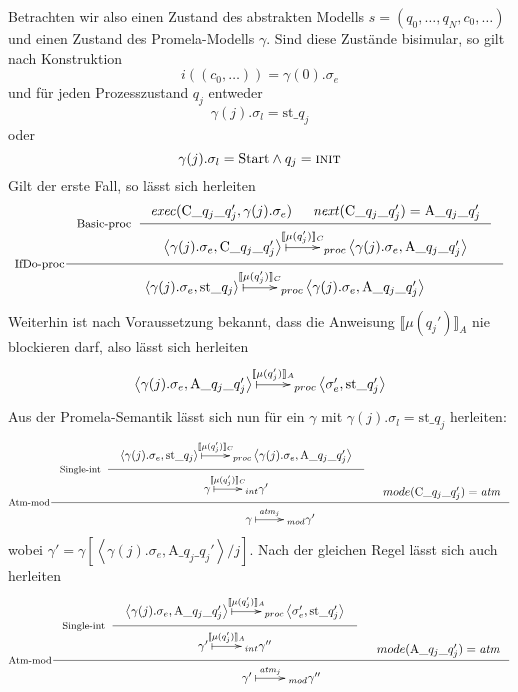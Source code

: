 Betrachten wir also einen Zustand des abstrakten Modells $s=(q_0,\dots,q_N,c_0,\dots)$ und einen Zustand des Promela-Modells $\gamma$.
Sind diese Zustände bisimular, so gilt nach Konstruktion
\[ i((c_0,\dots)) = \gamma(0).\sigma_e \]
und für jeden Prozesszustand $q_j$ entweder
\[ \gamma(j).\sigma_l = \textrm{st\_}q_j \]
oder
\[ \gamma(j).\sigma_l = \textrm{Start} \land q_j = \const{init} \]
Gilt der erste Fall, so lässt sich herleiten
\[ \inference[IfDo-proc]{
  \inference[Basic-proc]{\mathit{exec}(\textrm{C\_}q_j\textrm{\_}q_j',\gamma(j).\sigma_e) & \mathit{next}(\textrm{C\_}q_j\textrm{\_}q_j') = \textrm{A\_}q_j\textrm{\_}q_j'}{
  \xymatrix{ \left<\gamma(j).\sigma_e,\textrm{C\_}q_j\textrm{\_}q_j'\right>\ar@{|->}[r]^-{\llbracket \mu(q_j')\rrbracket_C} & _{proc}
    \left<\gamma(j).\sigma_e,\textrm{A\_}q_j\textrm{\_}q_j'\right>}
  }
  }
  { \xymatrix{ \left<\gamma(j).\sigma_e,\textrm{st\_}q_j\right> \ar@{|->}[r]^-{\llbracket \mu(q_j')\rrbracket_C} & _{proc}
      \left<\gamma(j).\sigma_e,\textrm{A\_}q_j\textrm{\_}q_j'\right>}
  }
\]
Weiterhin ist nach Voraussetzung bekannt, dass die Anweisung $\llbracket \mu(q_j')\rrbracket_A$ nie blockieren darf, also lässt sich herleiten
\[
  \xymatrix{ \left<\gamma(j).\sigma_e,\textrm{A\_}q_j\textrm{\_}q_j'\right> \ar@{|->}[r]^-{\llbracket \mu(q_j')\rrbracket_A} & _{proc}
    \left<\sigma_e',\textrm{st\_}q_j'\right> }
\]
Aus der Promela-Semantik lässt sich nun für ein $\gamma$ mit $\gamma(j).\sigma_l = \textrm{st\_}q_j$ herleiten:
\[
\inference[Atm-mod]{
  \inference[Single-int]{
    \xymatrix{ \left<\gamma(j).\sigma_e,\textrm{st\_}q_j\right> \ar@{|->}[r]^-{\llbracket \mu(q_j')\rrbracket_C} & _{proc}
      \left<\gamma(j).\sigma_e,\textrm{A\_}q_j\textrm{\_}q_j'\right> }
  }{
    \xymatrix{ \gamma \ar@{|->}[r]^-{\llbracket \mu(q_j')\rrbracket_C} & _{int}
      \gamma'
    }
  } & mode(\textrm{C\_}q_j\textrm{\_}q_j') = \mathit{atm}
}{
  \xymatrix{ \gamma \ar@{|->}[r]^-{\mathit{atm}_j} & _{mod}
    \gamma'
  }
}
\]
wobei $\gamma' = \gamma[\left<\gamma(j).\sigma_e,\textrm{A\_}q_j\textrm{\_}q_j'\right>/j]$.
Nach der gleichen Regel lässt sich auch herleiten
\[
\inference[Atm-mod]{
  \inference[Single-int]{
    \xymatrix{ \left<\gamma(j).\sigma_e,\textrm{A\_}q_j\textrm{\_}q_j'\right> \ar@{|->}[r]^-{\llbracket \mu(q_j')\rrbracket_A} & _{proc}
      \left<\sigma_e',\textrm{st\_}q_j'\right> }
  }{
    \xymatrix{ \gamma'\ar@{|->}[r]^-{\llbracket \mu(q_j')\rrbracket_A} & _{int}
      \gamma''
    }
  } & mode(\textrm{A\_}q_j\textrm{\_}q_j') = \mathit{atm}
}{
  \xymatrix{ \gamma'\ar@{|->}[r]^-{\mathit{atm}_j} & _{mod}
    \gamma''
  }
}
\]
